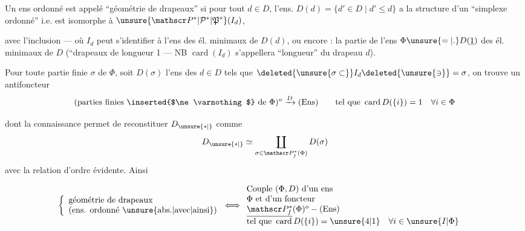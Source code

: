 
Un ens ordonné  est appelé ``géométrie de drapeaux'' si pour tout $d\in D$, l'ens.   $D(d)=\{d'\in D\mid d'\leq d\}$ a la structure d'un ``simplexe ordonné'' i.e. est isomorphe à $\unsure{\mathscr P^*|\mathcal P^*|\mathfrak P^*}(I_d)$,



avec l'inclusion --- où $I_d$ peut s'identifier à l'ens des él. minimaux de $D(d)$, ou encore : la partie de l'ens $\Phi\unsure{=|.}D(\underline{1})$ des él. minimaux de $D$ (``drapeaux de longueur 1 --- NB $\operatorname{card}(I_d)$ s'appellera ``longueur'' du drapeau $d$).

Pour toute partie finie $\sigma$ de $\Phi$, soit $D(\sigma)$ l'ens des $d\in D$ tels que $\deleted{\unsure{\sigma\subset}}I_d\deleted{\unsure{\ni}}=\sigma$, on trouve un antifoncteur
\[
 (\text{parties finies \inserted{$\ne\varnothing$} de }\Phi)^o\xrightarrow{D}(\mathrm{Ens})\qquad
 \text{tel que }\operatorname{card}D(\{i\})=1\quad\forall i\in\Phi
\]

dont la connaissance permet de reconstituer $D_{\unsure{*|{}}}$ comme
\[
 D_{\unsure{*|{}}}\simeq\coprod_{\sigma\in\mathscr P_f^*(\Phi)}D(\sigma)
\]
avec la relation d'ordre évidente. Ainsi

\[
\begin{aligned}
\left\{\begin{array}{l}\text{géométrie de drapeaux}\\\text{(ens. ordonné \unsure{abs.|avec|ainsi})}\end{array}\right.
 &\Longleftrightarrow \begin{array}{l}
 \text{Couple }(\Phi,D)\text{ d'un ens}\\
 \Phi\text{ et d'un foncteur}\\
 \underline{\mathscr P_f^*}(\Phi)^o\mathbin{-}(\mathrm{Ens})\\
 \text{tel que }\operatorname{card}D(\{i\})=\unsure{4|1}\quad\forall i\in\unsure{I|\Phi}
 \end{array}
\end{aligned}
\]

